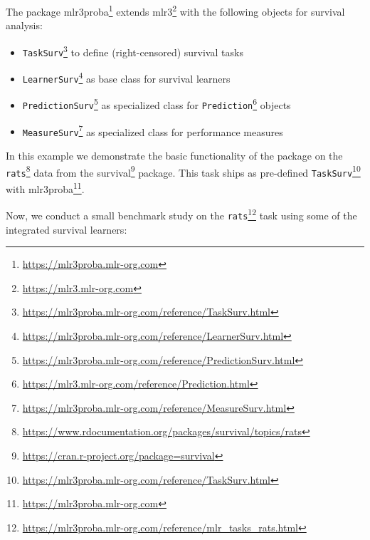 \documentclass[12pt,]{scrbook}
\newenvironment{Shaded}{}{}
\newcommand{\CommentTok}[1]{\textcolor[rgb]{0.00,0.50,0.00}{#1}}
\newcommand{\KeywordTok}[1]{\textcolor[rgb]{0.00,0.00,1.00}{#1}}
\newcommand{\NormalTok}[1]{#1}
\newcommand{\OperatorTok}[1]{#1}
\newcommand{\StringTok}[1]{\textcolor[rgb]{0.00,0.50,0.50}{#1}}
\providecommand{\tightlist}{%
  \setlength{\itemsep}{0pt}\setlength{\parskip}{0pt}}
\renewcommand{\href}[2]{#2\footnote{\url{#1}}}
\begin{document}
The package \href{https://mlr3proba.mlr-org.com}{mlr3proba} extends \href{https://mlr3.mlr-org.com}{mlr3} with the following objects for survival analysis:

\begin{itemize}
\tightlist
\item
  \href{https://mlr3proba.mlr-org.com/reference/TaskSurv.html}{\texttt{TaskSurv}} to define (right-censored) survival tasks
\item
  \href{https://mlr3proba.mlr-org.com/reference/LearnerSurv.html}{\texttt{LearnerSurv}} as base class for survival learners
\item
  \href{https://mlr3proba.mlr-org.com/reference/PredictionSurv.html}{\texttt{PredictionSurv}} as specialized class for \href{https://mlr3.mlr-org.com/reference/Prediction.html}{\texttt{Prediction}} objects
\item
  \href{https://mlr3proba.mlr-org.com/reference/MeasureSurv.html}{\texttt{MeasureSurv}} as specialized class for performance measures
\end{itemize}

In this example we demonstrate the basic functionality of the package on the \href{https://www.rdocumentation.org/packages/survival/topics/rats}{\texttt{rats}} data from the \href{https://cran.r-project.org/package=survival}{survival} package.
This task ships as pre-defined \href{https://mlr3proba.mlr-org.com/reference/TaskSurv.html}{\texttt{TaskSurv}} with \href{https://mlr3proba.mlr-org.com}{mlr3proba}.

\begin{Shaded}
\end{Shaded}

Now, we conduct a small benchmark study on the \href{https://mlr3proba.mlr-org.com/reference/mlr_tasks_rats.html}{\texttt{rats}} task using some of the integrated survival learners:
\end{document}
